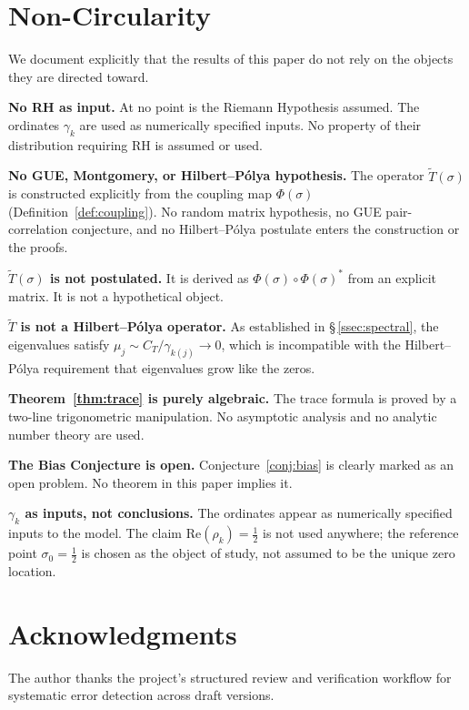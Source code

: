 \documentclass[11pt]{article}
\newcommand{\Tt}{\widetilde{T}}
\newcommand{\CT}{C_{T}}
\begin{document}
\section{Non-Circularity}
\label{sec:nocirc}

We document explicitly that the results of this paper do not rely
on the objects they are directed toward.

\textbf{No RH as input.}
At no point is the Riemann Hypothesis assumed.
The ordinates $\gamma_k$ are used as numerically specified inputs.
No property of their distribution requiring RH is assumed or used.

\textbf{No GUE, Montgomery, or Hilbert--P\'olya hypothesis.}
The operator $\Tt(\sigma)$ is constructed explicitly from the coupling
map $\Phi(\sigma)$ (Definition~\ref{def:coupling}).
No random matrix hypothesis, no GUE pair-correlation conjecture,
and no Hilbert--P\'olya postulate enters the construction or the proofs.

\textbf{$\Tt(\sigma)$ is not postulated.}
It is derived as $\Phi(\sigma)\circ\Phi(\sigma)^*$ from an explicit matrix.
It is not a hypothetical object.

\textbf{$\Tt$ is not a Hilbert--P\'olya operator.}
As established in \S\,\ref{ssec:spectral}, the eigenvalues satisfy
$\mu_j\sim\CT/\gamma_{k(j)}\to 0$, which is incompatible with the
Hilbert--P\'olya requirement that eigenvalues grow like the zeros.

\textbf{Theorem~\ref{thm:trace} is purely algebraic.}
The trace formula is proved by a two-line trigonometric manipulation.
No asymptotic analysis and no analytic number theory are used.

\textbf{The Bias Conjecture is open.}
Conjecture~\ref{conj:bias} is clearly marked as an open problem.
No theorem in this paper implies it.

\textbf{$\gamma_k$ as inputs, not conclusions.}
The ordinates appear as numerically specified inputs to the model.
The claim $\mathrm{Re}(\rho_k)=\tfrac{1}{2}$ is not used anywhere;
the reference point $\sigma_0=\tfrac{1}{2}$ is chosen as the object
of study, not assumed to be the unique zero location.

\section*{Acknowledgments}

The author thanks the project's structured review and verification
workflow for systematic error detection across draft versions.
\end{document}
